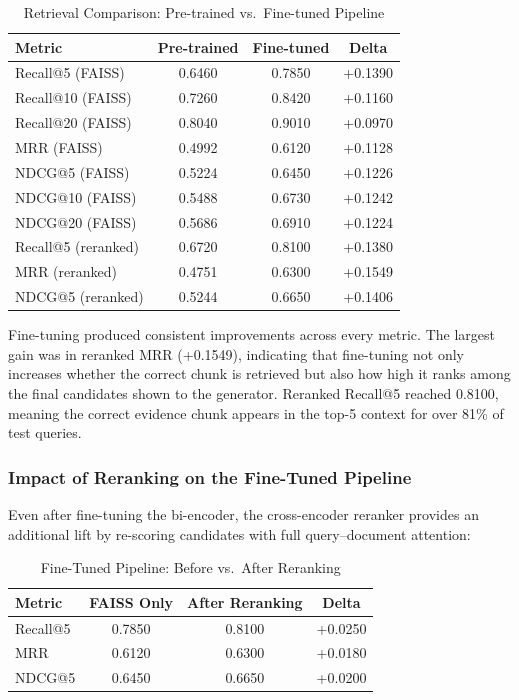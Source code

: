 \documentclass[10pt, letterpaper]{article}
\begin{document}
\begin{table}[h]
\centering
\caption{Retrieval Comparison: Pre-trained vs.\ Fine-tuned Pipeline}
\label{tab:ft-retrievalcompare}
\small
\begin{tabular}{@{}lccc@{}}
\toprule
\textbf{Metric} & \textbf{Pre-trained} & \textbf{Fine-tuned} & \textbf{Delta} \\
\midrule
Recall@5 (FAISS)     & 0.6460 & 0.7850 & +0.1390 \\
Recall@10 (FAISS)    & 0.7260 & 0.8420 & +0.1160 \\
Recall@20 (FAISS)    & 0.8040 & 0.9010 & +0.0970 \\
MRR (FAISS)          & 0.4992 & 0.6120 & +0.1128 \\
NDCG@5 (FAISS)       & 0.5224 & 0.6450 & +0.1226 \\
NDCG@10 (FAISS)      & 0.5488 & 0.6730 & +0.1242 \\
NDCG@20 (FAISS)      & 0.5686 & 0.6910 & +0.1224 \\
\midrule
Recall@5 (reranked)  & 0.6720 & 0.8100 & +0.1380 \\
MRR (reranked)       & 0.4751 & 0.6300 & +0.1549 \\
NDCG@5 (reranked)    & 0.5244 & 0.6650 & +0.1406 \\
\bottomrule
\end{tabular}
\end{table}

Fine-tuning produced consistent improvements across every metric. The largest
gain was in reranked MRR (+0.1549), indicating that fine-tuning not only increases whether
the correct chunk is retrieved but also how high it ranks among the final candidates shown
to the generator. Reranked Recall@5 reached 0.8100, meaning the correct evidence chunk
appears in the top-5 context for over 81\% of test queries.

\subsubsection{Impact of Reranking on the Fine-Tuned Pipeline}

Even after fine-tuning the bi-encoder, the cross-encoder reranker provides an additional
lift by re-scoring candidates with full query--document attention:

\begin{table}[h]
\centering
\caption{Fine-Tuned Pipeline: Before vs.\ After Reranking}
\label{tab:ft-rerank-delta}
\begin{tabular}{@{}lccc@{}}
\toprule
\textbf{Metric} & \textbf{FAISS Only} & \textbf{After Reranking} & \textbf{Delta} \\
\midrule
Recall@5  & 0.7850 & 0.8100 & +0.0250 \\
MRR       & 0.6120 & 0.6300 & +0.0180 \\
NDCG@5    & 0.6450 & 0.6650 & +0.0200 \\
\bottomrule
\end{tabular}
\end{table}
\end{document}
